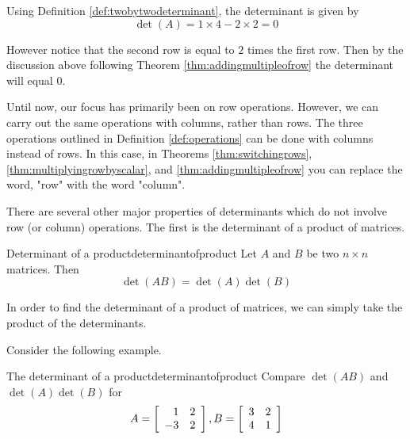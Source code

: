\begin{solution}
Using Definition \ref{def:twobytwodeterminant}, the determinant is given by
\[
\det \left( A \right) = 1 \times 4 - 2 \times 2 = 0
\]

However notice that the second row is equal to $2$ times the first row. Then by the discussion above following Theorem \ref{thm:addingmultipleofrow} the determinant will equal $0$.
\end{solution}

Until now, our focus has primarily been on row operations. However, we can carry out the 
same operations with columns, rather than rows. The three operations outlined in
Definition \ref{def:operations} can be done with columns instead of rows. 
In this case, in Theorems \ref{thm:switchingrows}, \ref{thm:multiplyingrowbyscalar}, 
and \ref{thm:addingmultipleofrow} you can replace
the word, "row" with the word "column".

There are several other major properties of determinants which do not involve
row (or column) operations. The first is the determinant of a product of matrices. 

\begin{theorem}{Determinant of a product}{determinantofproduct}
Let $A$ and $B$ be two $n\times n$ matrices. Then
\begin{equation*}
\det \left( AB\right) =\det \left( A\right) \det \left( B\right)
\end{equation*}
\end{theorem}

In order to find the determinant of a product of matrices, we can simply take the product of the determinants. 

Consider the following example.

\begin{example}{The determinant of a product}{determinantofproduct}
Compare $\det \left( AB\right) $ and $\det \left( A\right) \det \left(
B\right) $ for
\begin{equation*}
A=\left[
\begin{array}{rr}
1 & 2 \\
-3 & 2
\end{array}
\right] ,B=\left[
\begin{array}{rr}
3 & 2 \\
4 & 1
\end{array}
\right] 
\end{equation*}
\end{example}

